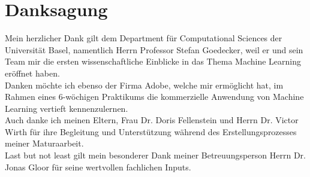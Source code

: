 \section*{Danksagung}
Mein herzlicher Dank gilt dem Department für Computational Sciences der
Universität Basel, namentlich Herrn Professor Stefan Goedecker, weil er und sein Team
mir die ersten wissenschaftliche Einblicke in das Thema Machine Learning
eröffnet haben. \\
Danken möchte ich ebenso der Firma Adobe, welche mir ermöglicht hat, im Rahmen
eines 6-wöchigen Praktikums die kommerzielle Anwendung von Machine Learning
vertieft kennenzulernen. \\
Auch danke ich meinen Eltern, Frau Dr. Doris Fellenstein und Herrn Dr. Victor
Wirth für ihre Begleitung und Unterstützung während des Erstellungsprozesses
meiner Maturaarbeit. \\
Last but not least gilt mein besonderer Dank meiner Betreuungsperson Herrn Dr. Jonas
Gloor für seine wertvollen fachlichen Inputs.

